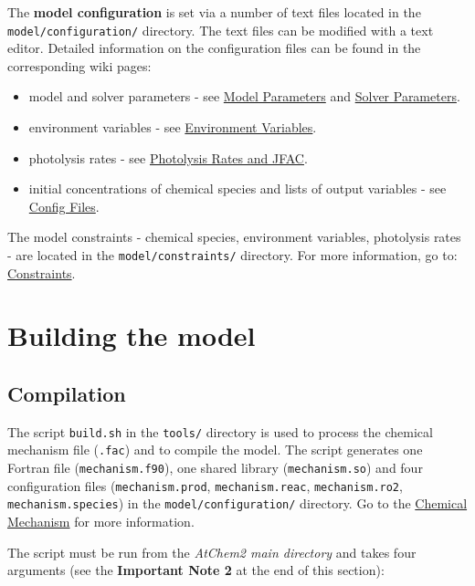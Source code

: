 The \textbf{model configuration} is set via a number of text files
located in the \texttt{model/configuration/} directory. The text files
can be modified with a text editor. Detailed information on the
configuration files can be found in the corresponding wiki pages:

\begin{itemize}
\item model and solver parameters - see
  \hyperref[sec:parameters]{Model Parameters} and
  \hyperref[sec:solver]{Solver Parameters}.
\item environment variables - see \hyperref[sec:envvar]{Environment
    Variables}.
\item photolysis rates - see \hyperref[sec:photolysis]{Photolysis
    Rates and JFAC}.
\item initial concentrations of chemical species and lists of output
  variables - see \hyperref[sec:config]{Config Files}.
\end{itemize}

The model constraints - chemical species, environment variables,
photolysis rates - are located in the \texttt{model/constraints/}
directory. For more information, go to:
\hyperref[sec:constraints]{Constraints}.

\section{Building the model} \label{sec:build}

\subsection{Compilation} \label{subsec:compilation}

The script \texttt{build.sh} in the \texttt{tools/} directory is used
to process the chemical mechanism file (\texttt{.fac}) and to compile
the model. The script generates one Fortran file
(\texttt{mechanism.f90}), one shared library (\texttt{mechanism.so})
and four configuration files (\texttt{mechanism.prod},
\texttt{mechanism.reac}, \texttt{mechanism.ro2},
\texttt{mechanism.species}) in the \texttt{model/configuration/}
directory. Go to the \hyperref[sec:mechanism]{Chemical Mechanism} for
more information.

The script must be run from the \emph{AtChem2 main directory} and
takes four arguments (see the \textbf{Important Note 2} at the end of
this section):


